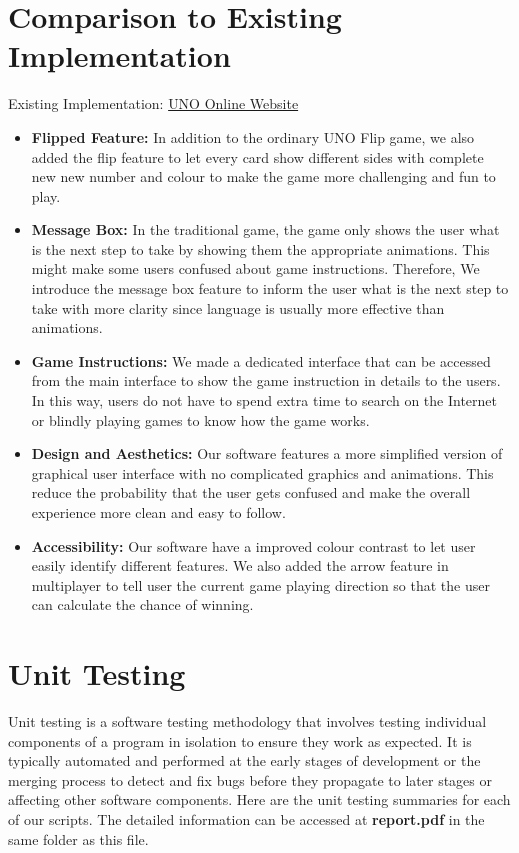 \documentclass[12pt, titlepage]{article}
\begin{document}
\section{Comparison to Existing Implementation}
Existing Implementation: \href{https://unoonline.io/}{UNO Online Website}
\begin{itemize}
    \item \textbf{Flipped Feature:}
    In addition to the ordinary UNO Flip game, we also added the flip feature to let every card show different sides with complete new new number and colour to make the game more challenging and fun to play.
    \item \textbf{Message Box:} In the traditional game, the game only shows the user what is the next step to take by showing them the appropriate animations. This might make some users confused about game instructions. Therefore, We introduce the message box feature to inform the user what is the next step to take with more clarity since language is usually more effective than animations.
    \item \textbf{Game Instructions:} We made a dedicated interface that can be accessed from the main interface to show the game instruction in details to the users. In this way, users do not have to spend extra time to search on the Internet or blindly playing games to know how the game works.
    \item \textbf{Design and Aesthetics:} Our software features a more simplified version of graphical user interface with no complicated graphics and animations. This reduce the probability that the user gets confused and make the overall experience more clean and easy to follow.
    \item \textbf{Accessibility:} Our software have a improved colour contrast to let user easily identify different features. We also added the arrow feature in multiplayer to tell user the current game playing direction so that the user can calculate the chance of winning. 
\end{itemize}

\section{Unit Testing}
Unit testing is a software testing methodology that involves testing individual components of a program in isolation to ensure they work as expected. It is typically automated and performed at the early stages of development or the merging process to detect and fix bugs before they propagate to later stages or affecting other software components. Here are the unit testing summaries for each of our scripts. The detailed information can be accessed at \textbf{report.pdf} in the same folder as this file.
\end{document}
